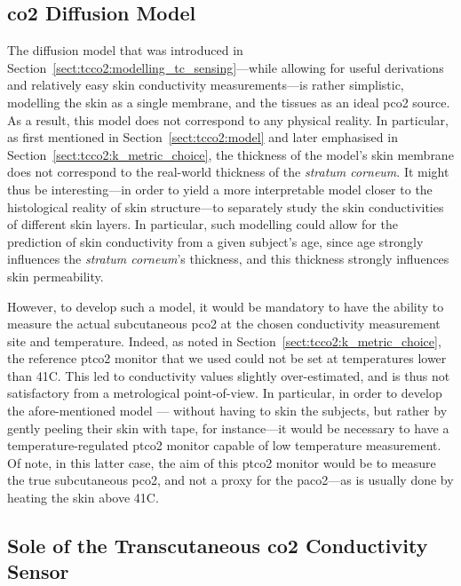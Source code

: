 \subsection{\texorpdfstring{\gls{co2}}{CO2} Diffusion Model}

The diffusion model that was introduced in Section~\ref{sect:tcco2:modelling_tc_sensing}---while allowing for useful derivations and relatively easy skin conductivity measurements---is rather simplistic, modelling the skin as a single membrane, and the tissues as an ideal \gls{pco2} source. As a result, this model does not correspond to any physical reality. In particular, as first mentioned in Section~\ref{sect:tcco2:model} and later emphasised in Section~\ref{sect:tcco2:k_metric_choice}, the thickness of the model's skin membrane does not correspond to the real-world thickness of the \textit{stratum corneum}. It might thus be interesting---in order to yield a more interpretable model closer to the histological reality of skin structure---to separately study the skin conductivities of different skin layers. In particular, such modelling could allow for the prediction of skin conductivity from a given subject's age, since age strongly influences the \textit{stratum corneum}'s thickness\cite{branchet1990}, and this thickness strongly influences skin permeability\cite{scheuplein1976}.

However, to develop such a model, it would be mandatory to have the ability to measure the actual subcutaneous \gls{pco2} at the chosen conductivity measurement site and temperature. Indeed, as noted in Section~\ref{sect:tcco2:k_metric_choice}, the reference \gls{ptco2} monitor that we used could not be set at temperatures lower than 41{\degree}C. This led to conductivity values slightly over-estimated, and is thus not satisfactory from a metrological point-of-view. In particular, in order to develop the afore-mentioned model \invivo{}---\ie{} without having to skin the subjects, but rather by gently peeling their skin with tape, for instance---it would be necessary to have a temperature-regulated \gls{ptco2} monitor capable of low temperature measurement. Of note, in this latter case, the aim of this \gls{ptco2} monitor would be to measure the true subcutaneous \gls{pco2}, and not a proxy for the \gls{paco2}---as is usually done by heating the skin above 41{\degree}C.

\subsection{Sole of the Transcutaneous \texorpdfstring{\gls{co2}}{CO2} Conductivity Sensor}

